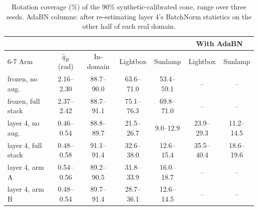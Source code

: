 \begin{table}[ht]
  \caption{Rotation coverage (\%) of the 90\% synthetic-calibrated cone, range over three seeds. AdaBN columns: after re-estimating layer 4's BatchNorm statistics on the other half of each real domain.}
  \label{tab:coverage-summary}
  \centering
  \footnotesize
  \setlength{\tabcolsep}{3pt}
  \begin{tabular}{l c ccc cc}
    \toprule
    & & & & & \multicolumn{2}{c}{With AdaBN} \\
    \cmidrule(lr){6-7}
    Arm & $\hat{q}_R$ (rad) & In-domain & Lightbox & Sunlamp & Lightbox & Sunlamp \\
    \midrule
    frozen, no aug. & 2.16--2.30 & 88.7--90.0 & 63.6--71.0 & 53.4--59.1 & -- & -- \\
    frozen, full stack & 2.37--2.42 & 88.7--91.1 & 75.1--76.3 & 69.8--71.0 & -- & -- \\
    layer 4, no aug. & 0.46--0.54 & 88.8--89.7 & 21.5--26.7 & 9.0--12.9 & 23.9--29.3 & 11.2--14.5 \\
    layer 4, full stack & 0.48--0.58 & 91.1--91.4 & 32.6--38.0 & 12.6--15.4 & 35.5--40.4 & 18.6--19.6 \\
    layer 4, arm A & 0.54--0.56 & 89.2--90.5 & 31.8--33.9 & 16.0--18.7 & -- & -- \\
    layer 4, arm B & 0.48--0.54 & 89.7--91.4 & 28.7--36.1 & 12.6--14.5 & -- & -- \\
    \bottomrule
  \end{tabular}
\end{table}
